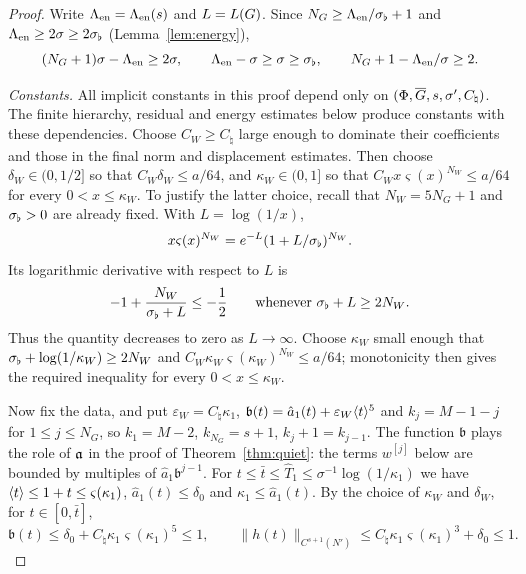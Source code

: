 \begin{proof}
Write $\Lambda_{\mathrm{en}}=\Lambda_{\mathrm{en}}(s)$ and $L=L(G)$. Since $N_G\ge\Lambda_{\mathrm{en}}/\sigma_\flat+1$ and
$\Lambda_{\mathrm{en}}\ge2\sigma\ge2\sigma_\flat$ (Lemma~\ref{lem:energy}),
\begin{equation}
\label{eq:W-exp}
(N_G+1)\sigma-\Lambda_{\mathrm{en}}\ge2\sigma,\qquad\Lambda_{\mathrm{en}}-\sigma\ge\sigma\ge\sigma_\flat,\qquad N_G+1-\Lambda_{\mathrm{en}}/\sigma\ge2 .
\end{equation}

\emph{Constants.} All implicit constants in this proof depend only on
$(\Phi,\overline{G},s,\sigma',C_\natural)$. The finite hierarchy, residual and energy
estimates below produce constants with these dependencies. Choose
$C_W\ge C_\natural$ large enough to dominate their coefficients and those in
the final norm and displacement estimates. Then choose
$\delta_W\in(0,1/2]$ so that $C_W\delta_W\le a/64$, and
$\kappa_W\in(0,1]$ so that
$C_Wx\varsigma(x)^{N_W}\le a/64$ for every $0<x\le\kappa_W$.
To justify the latter choice, recall that $N_W=5N_G+1$ and $\sigma_\flat>0$ are
already fixed. With $L=\log(1/x)$,
\[
x\varsigma(x)^{N_W}=e^{-L}(1+L/\sigma_\flat)^{N_W}.
\]
Its logarithmic derivative with respect to $L$ is
\[
-1+\frac{N_W}{\sigma_\flat+L}\le-\frac12
\qquad\text{whenever }\sigma_\flat+L\ge2N_W.
\]
Thus the quantity decreases to zero as $L\to\infty$. Choose $\kappa_W$
small enough that $\sigma_\flat+\log(1/\kappa_W)\ge2N_W$ and
$C_W\kappa_W\varsigma(\kappa_W)^{N_W}\le a/64$; monotonicity then gives
the required inequality for every $0<x\le\kappa_W$.

Now fix the data, and put $\varepsilon_W=C_\natural\kappa_1$,
$\mathfrak b(t)=\hat a_1(t)+\varepsilon_W\langle t\rangle^{5}$ and $k_j=M-1-j$ for
$1\le j\le N_G$, so $k_1=M-2$, $k_{N_G}=s+1$, $k_j+1=k_{j-1}$. The function
$\mathfrak b$ plays the role of $\mathfrak{a}$ in the proof of Theorem~\ref{thm:quiet}: the
terms $w^{[j]}$ below are bounded by multiples of $\hat a_1\mathfrak b^{j-1}$. For
$t\le\bar t\le\hat T_1\le\sigma^{-1}\log(1/\kappa_1)$ we have $\langle t\rangle\le1+t\le\varsigma(\kappa_1)$,
$\hat a_1(t)\le\delta_0$ and $\kappa_1\le\hat a_1(t)$. By the choice of $\kappa_W$ and
$\delta_W$, for $t\in[0,\bar t]$,
\begin{equation}
\label{eq:W-small}
\mathfrak b(t)\le\delta_0+C_\natural\kappa_1\varsigma(\kappa_1)^{5}\le1,\qquad
\|h(t)\|_{C^{s+1}(N')}\le C_\natural\kappa_1\varsigma(\kappa_1)^3+\delta_0\le1 .
\end{equation}


\end{proof}
